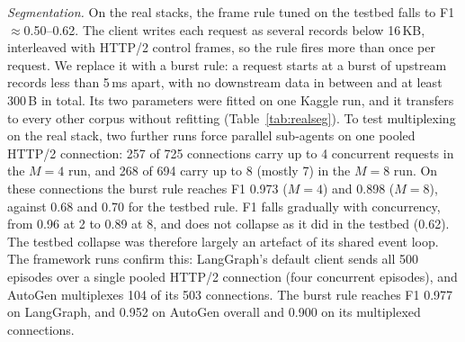 \emph{Segmentation.} On the real stacks, the frame rule tuned on the testbed falls to F1 $\approx$0.50--0.62. The client writes each request as several records below 16\,KB, interleaved with HTTP/2 control frames, so the rule fires more than once per request. We replace it with a burst rule: a request starts at a burst of upstream records less than 5\,ms apart, with no downstream data in between and at least 300\,B in total. Its two parameters were fitted on one Kaggle run, and it transfers to every other corpus without refitting (Table~\ref{tab:realseg}). To test multiplexing on the real stack, two further runs force parallel sub-agents on one pooled HTTP/2 connection: 257 of 725 connections carry up to 4 concurrent requests in the $M{=}4$ run, and 268 of 694 carry up to 8 (mostly 7) in the $M{=}8$ run. On these connections the burst rule reaches F1 0.973 ($M{=}4$) and 0.898 ($M{=}8$), against 0.68 and 0.70 for the testbed rule. F1 falls gradually with concurrency, from 0.96 at 2 to 0.89 at 8, and does not collapse as it did in the testbed (0.62). The testbed collapse was therefore largely an artefact of its shared event loop. The framework runs confirm this: LangGraph's default client sends all 500 episodes over a single pooled HTTP/2 connection (four concurrent episodes), and AutoGen multiplexes 104 of its 503 connections. The burst rule reaches F1 0.977 on LangGraph, and 0.952 on AutoGen overall and 0.900 on its multiplexed connections.

